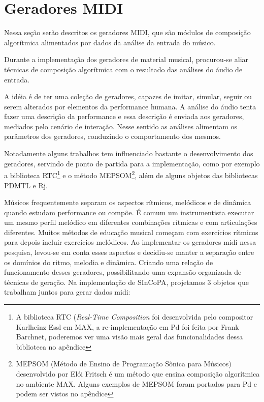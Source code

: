 \documentclass{ppgmus}
\begin{document}
\pagebreak





\section{Geradores MIDI}


Nessa seção serão descritos os geradores MIDI, que
são módulos de composição algorítmica alimentados
por dados da análise da entrada do músico.

Durante a implementação dos geradores de material musical,
procurou-se aliar técnicas de composição algorítmica com
o resultado das análises do áudio de entrada.


A idéia é de ter uma coleção de geradores, capazes
de imitar, simular, seguir ou serem alterados por elementos da performance humana. A análise do áudio
tenta fazer uma descrição da performance e essa descrição
é enviada aos geradores, mediados pelo cenário de interação.
Nesse sentido as análises alimentam os parâmetros dos
geradores, conduzindo o comportamento dos mesmos.



Notadamente alguns trabalhos tem influenciado bastante o desenvolvimento
dos geradores, servindo de ponto de partida para a implementação, como
por exemplo a biblioteca RTC\footnote{A biblioteca RTC (\textit{Real-Time Composition} 
foi desenvolvida pelo compositor Karlheinz Essl em MAX, a re-implementação
em Pd foi feita por Frank Barchnet, poderemos ver uma visão mais geral
das funcionalidades dessa biblioteca no apêndice} e o método MEPSOM\footnote{
MEPSOM (Método de Ensino de Programação Sônica para Músicos) desenvolvido por
Elói Fritsch é um método que ensina composição algorítmica no ambiente MAX. Alguns
exemplos de MEPSOM foram portados para Pd e podem ser vistos no apêndice}, além
de alguns objetos das bibliotecas PDMTL e Rj.  


Músicos frequentemente separam os aspectos rítmicos, melódicos e de dinâmica
quando estudam performance ou compõe. É comum um instrumentista executar um 
mesmo perfil melódico em diferentes combinações rítmicas e com articulações
diferentes. Muitos métodos de educação musical começam com exercícios rítmicos
para depois incluir exercícios melódicos. Ao implementar os geradores midi
nessa pesquisa, levou-se em conta esses aspectos e decidiu-se manter a separação
entre os domínios do ritmo, melodia e dinâmica. Criando uma relação de funcionamento
desses geradores, possibilitando uma expansão organizada de técnicas de geração.
Na implementação de SInCoPA, projetamos 3 objetos que trabalham juntos para
gerar dados midi: 
\end{document}
